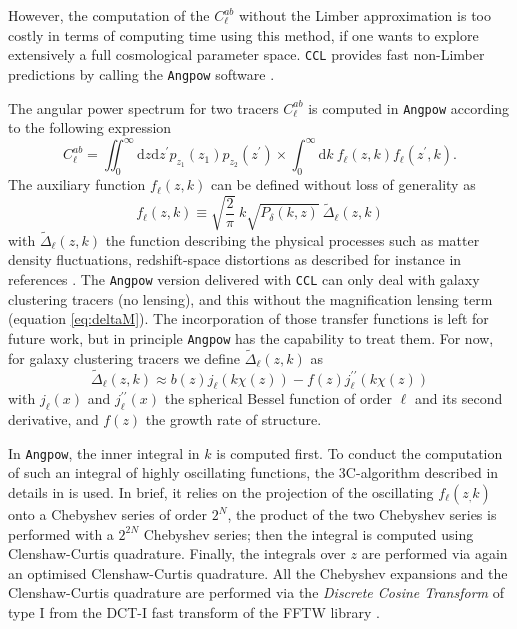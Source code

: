 \documentclass[\docopts]{\docclass}
\newcommand{\ccl}{{\tt CCL}\xspace}
\begin{document}
However, the computation of the $C^{ab}_\ell$ without the Limber approximation is too costly in terms of computing time using this method, if one wants to explore extensively a full cosmological parameter space. \ccl provides fast non-Limber predictions by calling the \texttt{Angpow} software \citep{2017A&A...602A..72C}. 

The angular power spectrum for two tracers $C_{\ell}^{ab}$ is computed in \texttt{Angpow} according to the following expression
\begin{equation}
  C_{\ell}^{ab} = \iint_0^\infty \mathrm{d} z \mathrm{d} z^\prime  p_{z_1}(z_1) p_{z_2}(z^\prime) \times \int_0^\infty \mathrm{d} k\ f_{\ell}(z, k) f_{\ell}(z^\prime, k).
  \label{eq-clz1z2-obs}
\end{equation}
The auxiliary function $f_\ell(z,k)$ can be defined without loss of generality as
\begin{equation}
f_\ell(z,k) \equiv  \sqrt{\frac{2}{\pi}}\  k \sqrt{P_\delta(k,z)}\ \widetilde{\Delta}_\ell(z,k)\label{eq-fell-func}
\end{equation}
with $\widetilde{\Delta}_\ell(z,k)$ the function describing the physical processes such as matter density fluctuations, redshift-space distortions as described for instance in references \citet{2008cmb..book.....D,2009PhRvD..80h3514Y,2010PhRvD..82h3508Y, 2011PhRvD..84d3516C,2011PhRvD..84f3505B}. The \texttt{Angpow} version delivered with \ccl can only deal with galaxy clustering tracers (no lensing), and this without the magnification lensing term (equation \ref{eq:deltaM}). The incorporation of those transfer functions is left for future work, but in principle \texttt{Angpow} has the capability to treat them. For now, for galaxy clustering tracers we define $\widetilde{\Delta}_\ell(z,k)$ as 
\begin{equation}
 \widetilde{\Delta}_\ell(z,k) \approx b(z) j_\ell(k \chi(z)) - f(z) j_\ell^{\prime\prime}(k \chi(z)) 
\end{equation}
with $j_\ell(x)$ and $j_\ell^{\prime\prime}(x)$ the spherical Bessel function of order $\ell$ and its second derivative, and $f(z)$ the growth rate of structure.

In \texttt{Angpow}, the inner integral in $k$ is computed first. 
To conduct the computation of such an integral of highly oscillating functions, the 3C-algorithm described in details in \citep{2017A&A...602A..72C} is used. In brief, it relies on the projection of the oscillating $f_\ell(z_,k)$ onto a Chebyshev series of order $2^N$, the product of the two Chebyshev series is performed with a $2^{2N}$ Chebyshev series; then the integral is computed using Clenshaw-Curtis quadrature. Finally, the integrals over $z$ are performed via again an optimised Clenshaw-Curtis quadrature. All the Chebyshev expansions and the Clenshaw-Curtis quadrature are performed via the \textit{Discrete Cosine Transform} of type I from the DCT-I fast transform of the FFTW library \citep{FFTW}.
\end{document}

